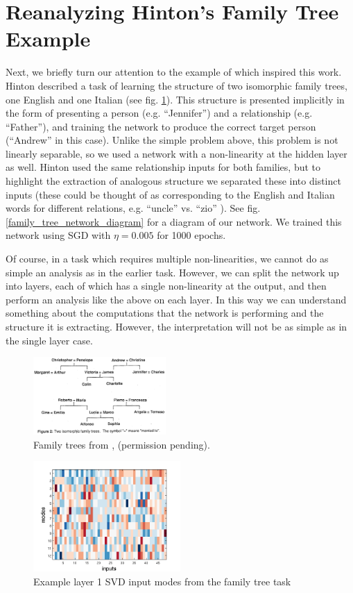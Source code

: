 \documentclass[10pt,letterpaper]{article}
\begin{document}
\section{Reanalyzing Hinton's Family Tree Example}
Next, we briefly turn our attention to the example of \citet{Hinton1986} which inspired this work. Hinton described a task of learning the structure of two isomorphic family trees, one English and one Italian (see fig. \ref{hinton_family_tree_figure}). This structure is presented implicitly in the form of presenting a person (e.g. ``Jennifer'') and a relationship (e.g. ``Father''), and training the network to produce the correct target person (``Andrew'' in this case). Unlike the simple problem above, this problem is not linearly separable, so we used a network with a non-linearity at the hidden layer as well. Hinton used the same relationship inputs for both families, but to highlight the extraction of analogous structure we separated these into distinct inputs (these could be thought of as corresponding to the English and Italian words for different relations, e.g. ``uncle'' vs. ``zio'' ). See fig. \ref{family_tree_network_diagram} for a diagram of our network. We trained this network using SGD with \(\eta = 0.005\) for 1000 epochs. \par 
Of course, in a task which requires multiple non-linearities, we cannot do as simple an analysis as in the earlier task. However, we can split the network up into layers, each of which has a single non-linearity at the output, and then perform an analysis like the above on each layer. In this way we can understand something about the computations that the network is performing and the structure it is extracting. However, the interpretation will not be as simple as in the single layer case. \par
\begin{figure}[H]
\centering
\includegraphics[width=0.45\textwidth]{figures/hinton_family_tree_figure.png}
\caption{Family trees from \citet{Hinton1986}, (permission pending).}
\label{hinton_family_tree_figure}
\end{figure}
\vspace{-2em}
\begin{figure}[H]
\centering
\includegraphics[width=0.5\textwidth]{figures/ft_input_mode_example.png}
\caption{Example layer 1 SVD input modes from the family tree task}
\label{ft_input_mode_example}
\end{figure}
\end{document}
